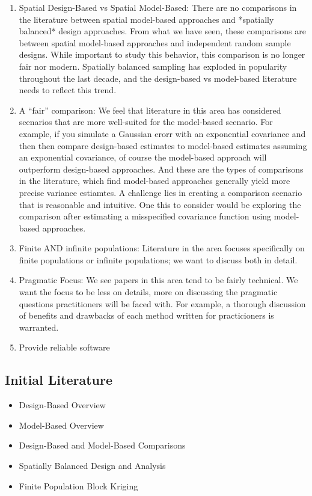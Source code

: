 \begin{enumerate}
  \item Spatial Design-Based vs Spatial Model-Based: There are no comparisons in the literature between spatial model-based approaches and *spatially balanced* design approaches. From what we have seen, these comparisons are between spatial model-based approaches and independent random sample designs. While important to study this behavior, this comparison is no longer fair nor modern. Spatially balanced sampling has exploded in popularity throughout the last decade, and the design-based vs model-based literature needs to reflect this trend.
  \item A ``fair'' comparison: We feel that literature in this area has considered scenarios that are more well-suited for the model-based scenario. For example, if you simulate a Gaussian erorr with an exponential covariance and then then compare design-based estimates to model-based estimates assuming an exponential covariance, of course the model-based approach will outperform design-based approaches. And these are the types of comparisons in the literature, which find model-based approaches generally yield more precise variance estiamtes. A challenge lies in creating a comparison scenario that is reasonable and intuitive. One this to consider would be exploring the comparison after estimating a misspecified covariance function using model-based approaches. 
  \item Finite AND infinite populations: Literature in the area focuses specifically on finite populations or infinite populations; we want to discuss both in detail.
  \item Pragmatic Focus: We see papers in this area tend to be fairly technical. We want the focus to be less on details, more on discussing the pragmatic questions practitioners will be faced with. For example, a thorough discussion of benefits and drawbacks of each method written for practicioners is warranted.
  \item Provide reliable software

\end{enumerate}

\subsection*{Initial Literature}

\begin{itemize}
  \item Design-Based Overview \citep{Sarndal2003model, Lohr2009sampling}
  \item Model-Based Overview \citep{Cressie2015statistics, Schabenberger2017statistical}
  \item Design-Based and Model-Based Comparisons \citep{Hansen1983evaluation, Brus1997random, VerHoef2002sampling, Cooper2006sampling, sterba2009alternative, Brus2020statistical, Chan2020bayesian}
  \item Spatially Balanced Design and Analysis \citep{StevensOlsen2003VarianceEstimation, StevensOlsen2004GRTS}
  \item Finite Population Block Kriging \citep{VerHoef2002sampling, VerHoef2008spatial, Higham2020adjusting}
\end{itemize}

